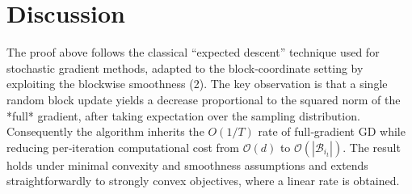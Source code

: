 \documentclass{article}
\newcommand{\E}{\mathbb{E}}
\begin{document}

\section*{Discussion}
The proof above follows the classical “expected descent” technique used for stochastic gradient methods, adapted to the block‑coordinate setting by exploiting the blockwise smoothness (2).  The key observation is that a single random block update yields a decrease proportional to the squared norm of the *full* gradient, after taking expectation over the sampling distribution.  Consequently the algorithm inherits the $O(1/T)$ rate of full‑gradient GD while reducing per‑iteration computational cost from $\mathcal O(d)$ to $\mathcal O(|\mathcal{B}_{i_{t}}|)$.  The result holds under minimal convexity and smoothness assumptions and extends straightforwardly to strongly convex objectives, where a linear rate is obtained.
\end{document}
